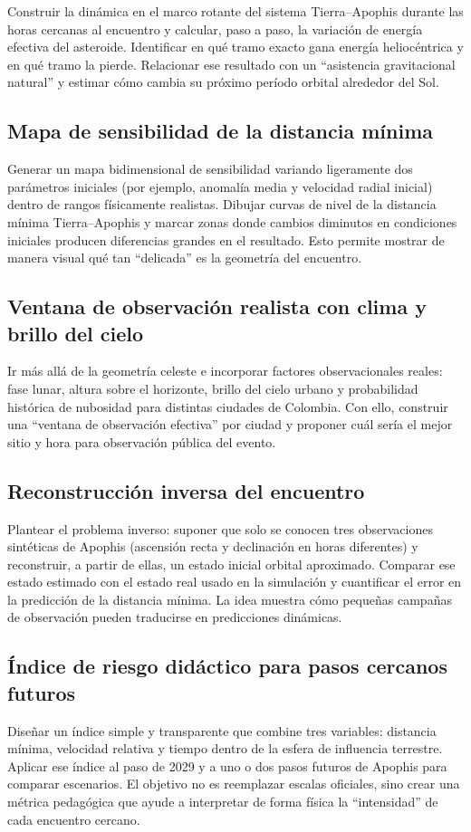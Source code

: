 Construir la dinámica en el marco rotante del sistema Tierra--Apophis durante las horas cercanas al encuentro y calcular, paso a paso, la variación de energía efectiva del asteroide. Identificar en qué tramo exacto gana energía heliocéntrica y en qué tramo la pierde. Relacionar ese resultado con un ``asistencia gravitacional natural'' y estimar cómo cambia su próximo período orbital alrededor del Sol.

\subsection{Mapa de sensibilidad de la distancia mínima}

Generar un mapa bidimensional de sensibilidad variando ligeramente dos parámetros iniciales (por ejemplo, anomalía media y velocidad radial inicial) dentro de rangos físicamente realistas. Dibujar curvas de nivel de la distancia mínima Tierra--Apophis y marcar zonas donde cambios diminutos en condiciones iniciales producen diferencias grandes en el resultado. Esto permite mostrar de manera visual qué tan ``delicada'' es la geometría del encuentro.

\subsection{Ventana de observación realista con clima y brillo del cielo}

Ir más allá de la geometría celeste e incorporar factores observacionales reales: fase lunar, altura sobre el horizonte, brillo del cielo urbano y probabilidad histórica de nubosidad para distintas ciudades de Colombia. Con ello, construir una ``ventana de observación efectiva'' por ciudad y proponer cuál sería el mejor sitio y hora para observación pública del evento.

\subsection{Reconstrucción inversa del encuentro}

Plantear el problema inverso: suponer que solo se conocen tres observaciones sintéticas de Apophis (ascensión recta y declinación en horas diferentes) y reconstruir, a partir de ellas, un estado inicial orbital aproximado. Comparar ese estado estimado con el estado real usado en la simulación y cuantificar el error en la predicción de la distancia mínima. La idea muestra cómo pequeñas campañas de observación pueden traducirse en predicciones dinámicas.

\subsection{Índice de riesgo didáctico para pasos cercanos futuros}

Diseñar un índice simple y transparente que combine tres variables: distancia mínima, velocidad relativa y tiempo dentro de la esfera de influencia terrestre. Aplicar ese índice al paso de 2029 y a uno o dos pasos futuros de Apophis para comparar escenarios. El objetivo no es reemplazar escalas oficiales, sino crear una métrica pedagógica que ayude a interpretar de forma física la ``intensidad'' de cada encuentro cercano.
